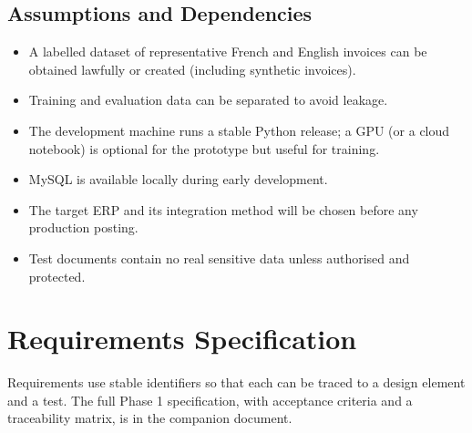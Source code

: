 \documentclass[11pt,a4paper]{report}
\begin{document}
\section{Assumptions and Dependencies}
\begin{itemize}
\item A labelled dataset of representative French and English invoices can be obtained lawfully or created (including synthetic invoices).
\item Training and evaluation data can be separated to avoid leakage.
\item The development machine runs a stable Python release; a GPU (or a cloud notebook) is optional for the prototype but useful for training.
\item MySQL is available locally during early development.
\item The target ERP and its integration method will be chosen before any production posting.
\item Test documents contain no real sensitive data unless authorised and protected.
\end{itemize}

\chapter{Requirements Specification}
Requirements use stable identifiers so that each can be traced to a design element and a test. The full Phase 1 specification, with acceptance criteria and a traceability matrix, is in the companion document.
\end{document}
